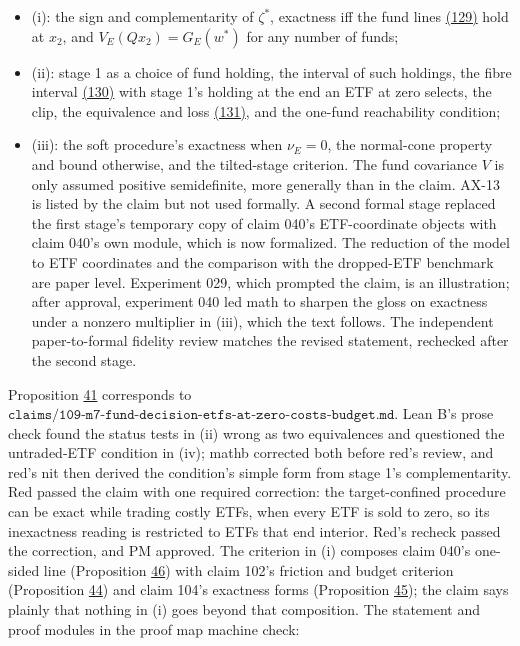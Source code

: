 \documentclass[11pt]{article}
\begin{document}
\begin{itemize}
  \item (i): the sign and complementarity of \(\zeta^*\), exactness iff the fund
  lines \hyperref[eq:129]{(129)} hold at \(x_2\), and \(V_E(Qx_2)=G_E(w^*)\) for any number of
  funds;
  \item (ii): stage 1 as a choice of fund holding, the interval of such
  holdings, the fibre interval \hyperref[eq:130]{(130)} with stage 1's holding at the end
  an ETF at zero selects, the clip, the equivalence and loss \hyperref[eq:131]{(131)}, and
  the one-fund reachability condition;
  \item (iii): the soft procedure's exactness when \(\nu_E=0\), the normal-cone
  property and bound otherwise, and the tilted-stage criterion.
The fund covariance \(V\) is only assumed positive semidefinite, more
generally than in the claim. AX-13 is listed by the claim but not used
formally. A second formal stage replaced the first stage's temporary
copy of claim 040's ETF-coordinate objects with claim 040's own module,
which is now formalized. The reduction of the model to ETF coordinates
and the comparison with the dropped-ETF benchmark are paper level.
Experiment 029, which prompted the claim, is an illustration; after
approval, experiment 040 led math to sharpen the gloss on exactness
under a nonzero multiplier in (iii), which the text follows. The
independent paper-to-formal fidelity review matches the revised
statement, rechecked after the second stage.
\end{itemize}

Proposition \hyperref[res:Proposition-41]{41} corresponds to
\(\texttt{claims/109-m7-fund-decision-etfs-at-zero-costs-budget.md}\). Lean B's
prose check found the status tests in (ii) wrong as two equivalences
and questioned the untraded-ETF condition in (iv); mathb corrected
both before red's review, and red's nit then derived the condition's
simple form from stage 1's complementarity. Red passed the claim with one required correction: the
target-confined procedure can be exact while trading costly ETFs, when
every ETF is sold to zero, so its inexactness reading is restricted to
ETFs that end interior. Red's recheck passed the correction, and PM
approved. The criterion in (i) composes claim 040's one-sided line
(Proposition \hyperref[res:Proposition-46]{46}) with claim 102's friction and
budget criterion (Proposition \hyperref[res:Proposition-44]{44}) and claim 104's exactness forms
(Proposition \hyperref[res:Proposition-45]{45}); the claim says
plainly that nothing in (i) goes beyond that composition. The
statement and proof modules in the proof map machine check:
\end{document}
